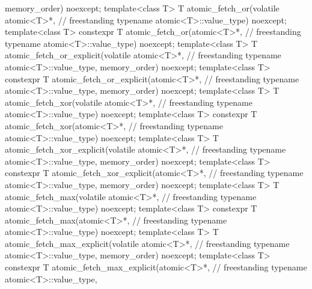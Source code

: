 \begin{codeblock}
{                                          memory_order) noexcept;
  template<class T>
    T atomic_fetch_or(volatile atomic<T>*,                                          // freestanding
                      typename atomic<T>::value_type) noexcept;
  template<class T>
    constexpr T atomic_fetch_or(atomic<T>*,                                         // freestanding
                                typename atomic<T>::value_type) noexcept;
  template<class T>
    T atomic_fetch_or_explicit(volatile atomic<T>*,                                 // freestanding
                               typename atomic<T>::value_type,
                               memory_order) noexcept;
  template<class T>
    constexpr T atomic_fetch_or_explicit(atomic<T>*,                                // freestanding
                                         typename atomic<T>::value_type,
                                         memory_order) noexcept;
  template<class T>
    T atomic_fetch_xor(volatile atomic<T>*,                                         // freestanding
                       typename atomic<T>::value_type) noexcept;
  template<class T>
    constexpr T atomic_fetch_xor(atomic<T>*,                                        // freestanding
                                 typename atomic<T>::value_type) noexcept;
  template<class T>
    T atomic_fetch_xor_explicit(volatile atomic<T>*,                                // freestanding
                                typename atomic<T>::value_type,
                                memory_order) noexcept;
  template<class T>
    constexpr T atomic_fetch_xor_explicit(atomic<T>*,                               // freestanding
                                          typename atomic<T>::value_type,
                                          memory_order) noexcept;
  template<class T>
    T atomic_fetch_max(volatile atomic<T>*,                                         // freestanding
                       typename atomic<T>::value_type) noexcept;
  template<class T>
    constexpr T atomic_fetch_max(atomic<T>*,                                        // freestanding
                       typename atomic<T>::value_type) noexcept;
  template<class T>
    T atomic_fetch_max_explicit(volatile atomic<T>*,                                // freestanding
                                typename atomic<T>::value_type,
                                memory_order) noexcept;
  template<class T>
    constexpr T atomic_fetch_max_explicit(atomic<T>*,                               // freestanding
                                typename atomic<T>::value_type,
}
\end{codeblock}
